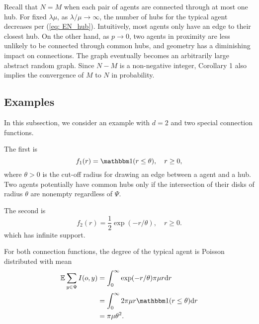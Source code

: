 \begin{remark}Recall that $N=M$ when each pair of agents are connected through at most one hub. 
 For fixed $\lambda\mu$, as $\lambda/\mu\to\infty$, the number of hubs for the typical agent decreases per (\ref{eq: EN_hub}). Intuitively, most agents only have an edge to their closest hub. 
 On the other hand, as $p\to0$, two agents in proximity are less unlikely to be connected through common hubs, and geometry has a diminishing impact on connections. The graph eventually becomes an arbitrarily large abstract random graph.  Since $N-M$ is a non-negative integer, Corollary 1 also implies the convergence of $M$ to $N$ in probability.
\end{remark}
 
 
 \subsection{Examples}
   In this subsection, we consider an example with $d=2$ and two special connection functions. 
    
    The first is\begin{equation}
  \nonumber  f_1(r) = \ind{(r\leq \theta)},\quad r\geq 0,\label{eq: disk}
      \end{equation} 
      where $\theta>0$ is the cut-off radius for drawing an edge between a agent and a hub. Two agents potentially have common hubs only if the intersection of their disks of radius $\theta$ are nonempty regardless of $\Psi$.
      
The second is
   \begin{equation}
\nonumber        f_2(r) =\frac{1}{2}\exp(-r/\theta),\quad r\geq 0.
\label{eq: exp dist}
\end{equation}
which has infinite support.
 


For both connection functions, the degree of the typical agent is Poisson distributed with mean 
    \begin{align}
      \Ex \sum_{y\in\Psi}I(o,y)&= \int_{0}^{\infty}\exp(- r/\theta)\pi\mu r \dd r\nonumber\\
      &=\int_{0}^{\infty} 2\pi\mu r \ind{(r\leq \theta)} \dd r\nonumber\\
      &= {\pi\mu}{\theta^2}.\nonumber\label{eq: EN_hub}
    \end{align}

